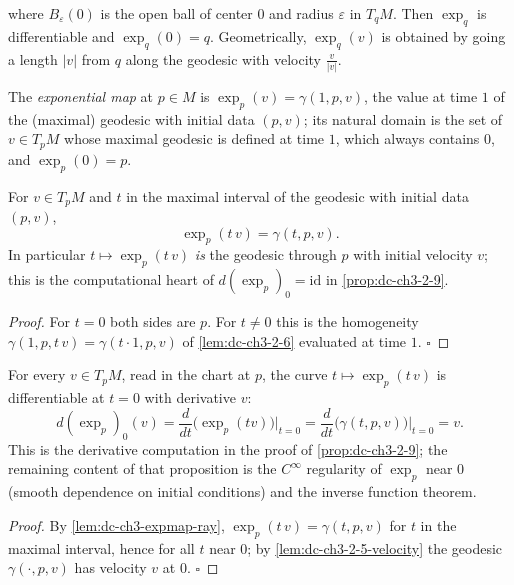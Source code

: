 where $B_\varepsilon(0)$ is the open ball of center $0$ and radius $\varepsilon$
in $T_qM$. Then $\exp_q$ is differentiable and $\exp_q(0)=q$. Geometrically,
$\exp_q(v)$ is obtained by going a length $|v|$ from $q$ along the geodesic with
velocity $\frac{v}{|v|}$.

\begin{definition}
  \label{def:dc-ch3-expmap}
  \leanok
  The \emph{exponential map} at $p\in M$ is $\exp_p(v)=\gamma(1,p,v)$, the value at
  time $1$ of the (maximal) geodesic with initial data $(p,v)$; its natural
  domain is the set of $v\in T_pM$ whose maximal geodesic is defined at time
  $1$, which always contains $0$, and $\exp_p(0)=p$.
\end{definition}

\begin{lemma}
  \label{lem:dc-ch3-expmap-ray}
  \leanok
  For $v\in T_pM$ and $t$ in the maximal interval of the geodesic with initial
  data $(p,v)$,
  $$\exp_p(t\,v)=\gamma(t,p,v).$$
  In particular $t\mapsto\exp_p(t\,v)$ \emph{is} the geodesic through $p$ with
  initial velocity $v$; this is the computational heart of
  $d(\exp_p)_0=\mathrm{id}$ in \cref{prop:dc-ch3-2-9}.
\end{lemma}
\begin{proof}
  \leanok
  For $t=0$ both sides are $p$. For $t\neq0$ this is the homogeneity
  $\gamma(1,p,t\,v)=\gamma(t\cdot 1,p,v)$ of \cref{lem:dc-ch3-2-6} evaluated at
  time $1$. $\square$
\end{proof}

\begin{lemma}[$d(\exp_p)_0=\mathrm{id}$ along rays]
  \label{lem:dc-ch3-2-9-dexp}
  \leanok
  For every $v\in T_pM$, read in the chart at $p$, the curve
  $t\mapsto\exp_p(t\,v)$ is differentiable at $t=0$ with derivative $v$:
  $$
  d(\exp_p)_0(v)=\frac{d}{dt}\big(\exp_p(tv)\big)\Big|_{t=0}
    =\frac{d}{dt}\big(\gamma(t,p,v)\big)\Big|_{t=0}=v.
  $$
  This is the derivative computation in the proof of \cref{prop:dc-ch3-2-9};
  the remaining content of that proposition is the $C^\infty$ regularity of
  $\exp_p$ near $0$ (smooth dependence on initial conditions) and the inverse
  function theorem.
\end{lemma}
\begin{proof}
  \leanok
  By \cref{lem:dc-ch3-expmap-ray}, $\exp_p(t\,v)=\gamma(t,p,v)$ for $t$ in the
  maximal interval, hence for all $t$ near $0$; by
  \cref{lem:dc-ch3-2-5-velocity} the geodesic $\gamma(\cdot,p,v)$ has velocity
  $v$ at $0$. $\square$
\end{proof}

